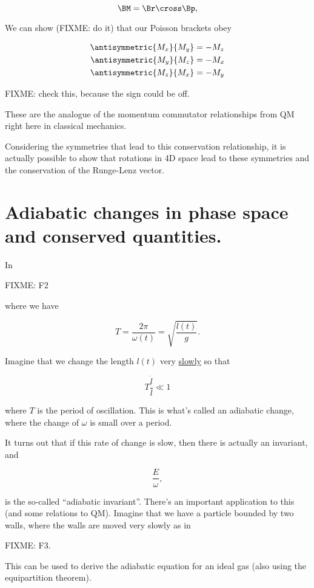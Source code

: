 \begin{equation}\label{eqn:phaseSpaceAndTrajectories:310}
\BM = \Br \cross \Bp,
\end{equation}

We can show (FIXME: do it) that our Poisson brackets obey

\begin{align}\label{eqn:phaseSpaceAndTrajectories:330}
\antisymmetric{M_x}{M_y} &= -M_z \\
\antisymmetric{M_y}{M_z} &= -M_x \\
\antisymmetric{M_z}{M_x} &= -M_y
\end{align}

FIXME: check this, because the sign could be off.

These are the analogue of the momentum commutator relationships from QM right here in classical mechanics.

Considering the symmetries that lead to this conservation relationship, it is actually possible to show that rotations in 4D space lead to these symmetries and the conservation of the Runge-Lenz vector.

\section{Adiabatic changes in phase space and conserved quantities.}

In 

FIXME: F2

where we have

\begin{equation}\label{eqn:phaseSpaceAndTrajectories:350}
T = \frac{2 \pi}{\omega(t)} = \sqrt{\frac{l(t)}{g}}.
\end{equation}

Imagine that we change the length $l(t)$ very \underline{slowly} so that

\begin{equation}\label{eqn:phaseSpaceAndTrajectories:370}
T \frac{\dot{l}}{l} \ll 1
\end{equation}

where $T$ is the period of oscillation.  This is what's called an adiabatic change, where the change of $\omega$ is small over a period.

It turns out that if this rate of change is slow, then there is actually an invariant, and

\begin{equation}\label{eqn:phaseSpaceAndTrajectories:390}
\frac{E}{\omega},
\end{equation}

is the so-called ``adiabatic invariant''.  There's an important application to this (and some relations to QM).  Imagine that we have a particle bounded by two walls, where the walls are moved very slowly as in

FIXME: F3.

This can be used to derive the adiabatic equation for an ideal gas (also using the equipartition theorem).

\EndNoBibArticle
